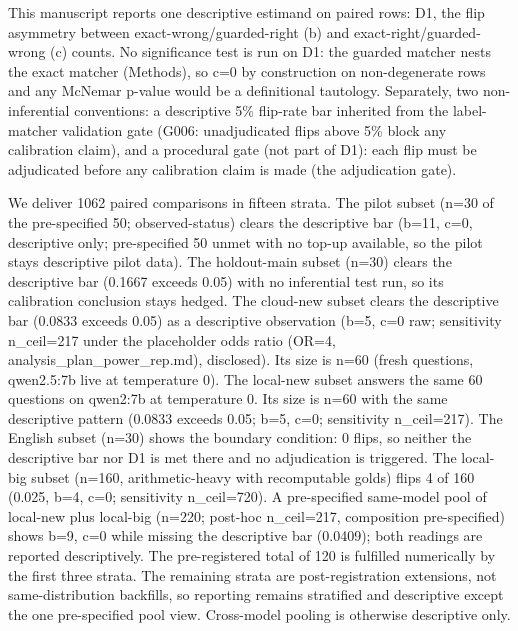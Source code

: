 \documentclass[10pt]{article} %
\begin{document}
This manuscript reports one descriptive estimand on paired rows:
D1, the flip asymmetry between exact-wrong/guarded-right (b) and exact-right/guarded-wrong (c) counts. No significance test is run on D1: the guarded matcher nests the exact matcher (Methods), so c=0 by construction on non-degenerate rows and any McNemar p-value would be a definitional tautology. Separately, two non-inferential conventions: a descriptive 5\% flip-rate bar inherited from the label-matcher validation gate (G006: unadjudicated flips above 5\% block any calibration claim), and a procedural gate (not part of D1): each flip must be adjudicated before any calibration claim is made (the adjudication gate).

We deliver 1062 paired comparisons in fifteen strata.
The pilot subset (n=30 of the pre-specified 50; observed-status) clears the descriptive bar (b=11, c=0, descriptive only; pre-specified 50 unmet with no top-up available, so the pilot stays descriptive pilot data).
The holdout-main subset (n=30) clears the descriptive bar (0.1667 exceeds 0.05) with no inferential test run, so its calibration conclusion stays hedged.
The cloud-new subset clears the descriptive bar (0.0833 exceeds 0.05) as a descriptive observation (b=5, c=0 raw; sensitivity n\_ceil=217 under the placeholder odds ratio (OR=4, analysis\_plan\_power\_rep.md), disclosed).
Its size is n=60 (fresh questions, qwen2.5:7b live at temperature 0).
The local-new subset answers the same 60 questions on qwen2:7b at temperature 0.
Its size is n=60 with the same descriptive pattern (0.0833 exceeds 0.05; b=5, c=0; sensitivity n\_ceil=217).
The English subset (n=30) shows the boundary condition: 0 flips, so neither the descriptive bar nor D1 is met there and no adjudication is triggered.
The local-big subset (n=160, arithmetic-heavy with recomputable golds) flips 4 of 160 (0.025, b=4, c=0; sensitivity n\_ceil=720).
A pre-specified same-model pool of local-new plus local-big (n=220; post-hoc n\_ceil=217, composition pre-specified) shows b=9, c=0 while missing the descriptive bar (0.0409); both readings are reported descriptively.
The pre-registered total of 120 is fulfilled numerically by the first three strata.
The remaining strata are post-registration extensions, not same-distribution backfills, so reporting remains stratified and descriptive except the one pre-specified pool view.
Cross-model pooling is otherwise descriptive only.
\end{document}
